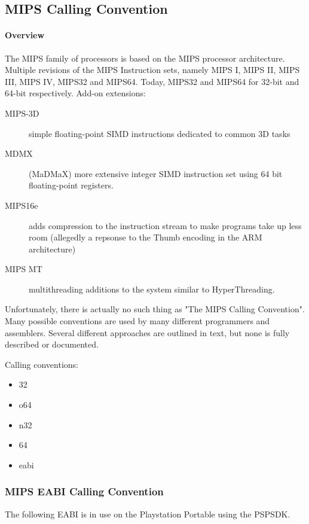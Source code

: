 \subsection{MIPS Calling Convention}

\paragraph{Overview}

The MIPS family of processors is based on the MIPS processor architecture.
Multiple revisions of the MIPS Instruction sets, namely MIPS I, MIPS II, MIPS III, MIPS IV, MIPS32 and MIPS64.
Today, MIPS32 and MIPS64 for 32-bit and 64-bit respectively.
Add-on extensions: 

\begin{description}
\item [MIPS-3D] simple floating-point SIMD instructions dedicated to common 3D tasks
\item [MDMX] (MaDMaX) more extensive integer SIMD instruction set using 64 bit floating-point registers.
\item [MIPS16e] adds compression to the instruction stream to make programs take up less room (allegedly a repsonse to the Thumb encoding in the ARM architecture)
\item [MIPS MT] multithreading additions to the system similar to HyperThreading.
\end{description}

Unfortunately, there is actually no such thing as "The MIPS Calling Convention".  Many possible conventions are used
by many different programmers and assemblers. Several different approaches are
outlined in text, but none is fully described or documented.

Calling conventions:
\begin{itemize}
\item 32
\item o64
\item n32
\item 64
\item eabi
\end{itemize}

\subsubsection{MIPS EABI Calling Convention}

The following EABI is in use on the Playstation Portable using the PSPSDK.

